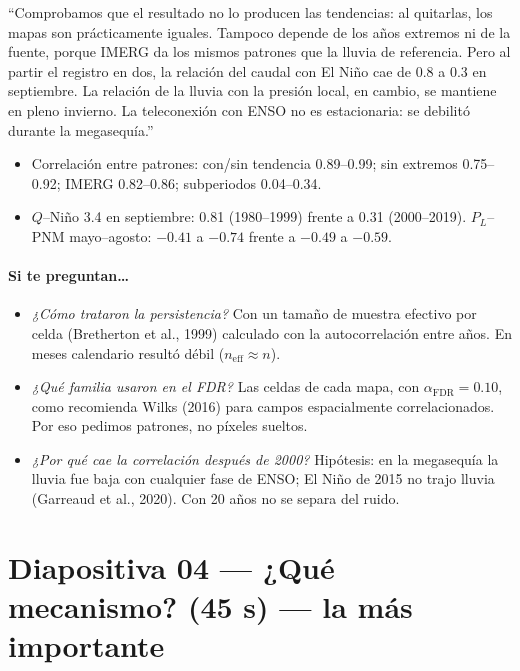 \documentclass[11pt,letterpaper]{article}
\begin{document}
\begin{guion}
``Comprobamos que el resultado no lo producen las tendencias: al quitarlas, los mapas son prácticamente iguales.
Tampoco depende de los años extremos ni de la fuente, porque IMERG da los mismos patrones que la lluvia de
referencia. Pero al partir el registro en dos, la relación del caudal con El Niño cae de 0.8 a 0.3 en
septiembre. La relación de la lluvia con la presión local, en cambio, se mantiene en pleno invierno. La
teleconexión con ENSO no es estacionaria: se debilitó durante la megasequía.''
\end{guion}

\begin{cifras}
\begin{itemize}
\item Correlación entre patrones: con/sin tendencia 0.89--0.99; sin extremos 0.75--0.92; IMERG 0.82--0.86;
subperiodos 0.04--0.34.
\item $Q$--Niño 3.4 en septiembre: 0.81 (1980--1999) frente a 0.31 (2000--2019). $P_L$--PNM mayo--agosto: $-0.41$ a $-0.74$ frente a $-0.49$ a $-0.59$.
\end{itemize}
\end{cifras}

\paragraph{Si te preguntan\ldots}
\begin{itemize}
\item \emph{¿Cómo trataron la persistencia?} Con un tamaño de muestra efectivo por celda (Bretherton et al., 1999)
calculado con la autocorrelación entre años. En meses calendario resultó débil ($n_\mathrm{eff}\approx n$).
\item \emph{¿Qué familia usaron en el FDR?} Las celdas de cada mapa, con $\alpha_\mathrm{FDR}=0.10$, como
recomienda Wilks (2016) para campos espacialmente correlacionados. Por eso pedimos patrones, no píxeles sueltos.
\item \emph{¿Por qué cae la correlación después de 2000?} Hipótesis: en la megasequía la lluvia fue baja con
cualquier fase de ENSO; El Niño de 2015 no trajo lluvia (Garreaud et al., 2020). Con 20 años no se separa del
ruido.
\end{itemize}

\section{Diapositiva 04 --- ¿Qué mecanismo? (45 s) --- la más importante}
\end{document}
